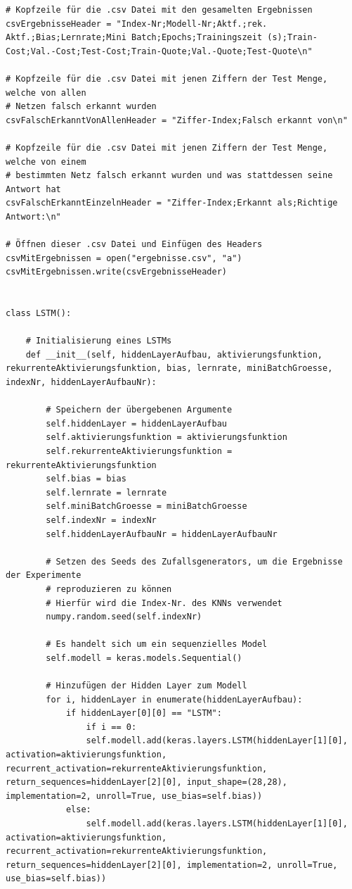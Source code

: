 \documentclass[a4paper,12pt,ngerman,oneside]{scrreprt}	%
\begin{document}
{\begin{lstlisting}
# Kopfzeile für die .csv Datei mit den gesamelten Ergebnissen
csvErgebnisseHeader = "Index-Nr;Modell-Nr;Aktf.;rek. Aktf.;Bias;Lernrate;Mini Batch;Epochs;Trainingszeit (s);Train-Cost;Val.-Cost;Test-Cost;Train-Quote;Val.-Quote;Test-Quote\n"

# Kopfzeile für die .csv Datei mit jenen Ziffern der Test Menge, welche von allen
# Netzen falsch erkannt wurden
csvFalschErkanntVonAllenHeader = "Ziffer-Index;Falsch erkannt von\n"

# Kopfzeile für die .csv Datei mit jenen Ziffern der Test Menge, welche von einem
# bestimmten Netz falsch erkannt wurden und was stattdessen seine Antwort hat
csvFalschErkanntEinzelnHeader = "Ziffer-Index;Erkannt als;Richtige Antwort:\n"

# Öffnen dieser .csv Datei und Einfügen des Headers
csvMitErgebnissen = open("ergebnisse.csv", "a")
csvMitErgebnissen.write(csvErgebnisseHeader)


class LSTM():
	
	# Initialisierung eines LSTMs
	def __init__(self, hiddenLayerAufbau, aktivierungsfunktion, rekurrenteAktivierungsfunktion, bias, lernrate, miniBatchGroesse, indexNr, hiddenLayerAufbauNr):
	
		# Speichern der übergebenen Argumente
		self.hiddenLayer = hiddenLayerAufbau
		self.aktivierungsfunktion = aktivierungsfunktion
		self.rekurrenteAktivierungsfunktion = rekurrenteAktivierungsfunktion
		self.bias = bias
		self.lernrate = lernrate
		self.miniBatchGroesse = miniBatchGroesse
		self.indexNr = indexNr
		self.hiddenLayerAufbauNr = hiddenLayerAufbauNr
		
		# Setzen des Seeds des Zufallsgenerators, um die Ergebnisse der Experimente
		# reproduzieren zu können
		# Hierfür wird die Index-Nr. des KNNs verwendet
		numpy.random.seed(self.indexNr)
		
		# Es handelt sich um ein sequenzielles Model
		self.modell = keras.models.Sequential()
		
		# Hinzufügen der Hidden Layer zum Modell
		for i, hiddenLayer in enumerate(hiddenLayerAufbau):
			if hiddenLayer[0][0] == "LSTM":
				if i == 0:
				self.modell.add(keras.layers.LSTM(hiddenLayer[1][0], activation=aktivierungsfunktion, recurrent_activation=rekurrenteAktivierungsfunktion, return_sequences=hiddenLayer[2][0], input_shape=(28,28), implementation=2, unroll=True, use_bias=self.bias))
			else:
				self.modell.add(keras.layers.LSTM(hiddenLayer[1][0], activation=aktivierungsfunktion, recurrent_activation=rekurrenteAktivierungsfunktion, return_sequences=hiddenLayer[2][0], implementation=2, unroll=True, use_bias=self.bias))
			

\end{lstlisting}}
\end{document}
